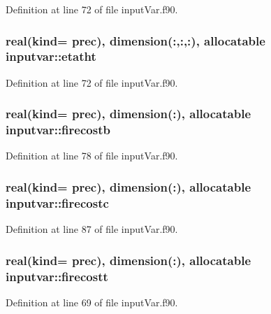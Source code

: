 Definition at line 72 of file input\-Var.\-f90.

\hypertarget{classinputvar_a93c858e92300ce7dfc06627cbc72d681}{
\subsubsection[{etatht}]{\setlength{\rightskip}{0pt plus 5cm}real(kind= prec), dimension(\-:,\-:,\-:), allocatable inputvar\-::etatht}}\label{classinputvar_a93c858e92300ce7dfc06627cbc72d681}


Definition at line 72 of file input\-Var.\-f90.

\hypertarget{classinputvar_a1560f8312d0c0606566ee8f7e21c1e49}{
\subsubsection[{firecostb}]{\setlength{\rightskip}{0pt plus 5cm}real(kind= prec), dimension(\-:), allocatable inputvar\-::firecostb}}\label{classinputvar_a1560f8312d0c0606566ee8f7e21c1e49}


Definition at line 78 of file input\-Var.\-f90.

\hypertarget{classinputvar_afa2d0c05087f3cda5d3e984037a2a354}{
\subsubsection[{firecostc}]{\setlength{\rightskip}{0pt plus 5cm}real(kind= prec), dimension(\-:), allocatable inputvar\-::firecostc}}\label{classinputvar_afa2d0c05087f3cda5d3e984037a2a354}


Definition at line 87 of file input\-Var.\-f90.

\hypertarget{classinputvar_a57526f25accbe0af7902997bd9cde614}{
\subsubsection[{firecostt}]{\setlength{\rightskip}{0pt plus 5cm}real(kind= prec), dimension(\-:), allocatable inputvar\-::firecostt}}\label{classinputvar_a57526f25accbe0af7902997bd9cde614}


Definition at line 69 of file input\-Var.\-f90.

